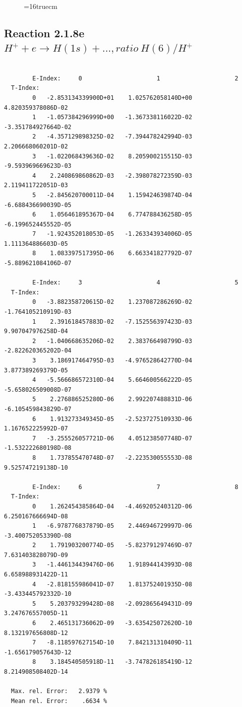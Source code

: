 \documentclass[12pt,dvips]{article}
\begin{document}
\begin{figure} \label{2.1.8rd}
\epsfxsize=16truecm
\end{figure}
\newpage



\subsection{
Reaction 2.1.8e  $H^+ + e \rightarrow H(1s) + ...,  ratio ~ H(6)/H^+$
}

\begin{small}\begin{verbatim}

        E-Index:     0                     1                     2
  T-Index:
        0   -2.853134339900D+01    1.025762058140D+00    4.820359378086D-02
        1   -1.057384296999D+00   -1.367338116022D-02   -3.351784927664D-02
        2   -4.357129898325D-02   -7.394478242994D-03    2.206668060201D-02
        3   -1.022068439636D-02    8.205900215515D-03   -9.593969669623D-03
        4    2.240869860862D-03   -2.398078272359D-03    2.119411722051D-03
        5   -2.845620700011D-04    1.159424639874D-04   -6.688436690039D-05
        6    1.056461895367D-04    6.774788436258D-05   -6.199652445552D-05
        7   -1.924352018053D-05   -1.263343934006D-05    1.111364886603D-05
        8    1.083397517395D-06    6.663341827792D-07   -5.889621084106D-07

        E-Index:     3                     4                     5
  T-Index:
        0   -3.882358720615D-02    1.237087286269D-02   -1.764105210919D-03
        1    2.391618457883D-02   -7.152556397423D-03    9.907047976258D-04
        2   -1.040668635206D-02    2.383766498799D-03   -2.822620365202D-04
        3    3.186917464795D-03   -4.976528642770D-04    3.877389269379D-05
        4   -5.566686572310D-04    5.664600566222D-05   -5.658026509008D-07
        5    2.276886525280D-06    2.992207488831D-06   -6.105459843829D-07
        6    1.913273349345D-05   -2.523727510933D-06    1.167652225992D-07
        7   -3.255526057721D-06    4.051238507748D-07   -1.532222680198D-08
        8    1.737855470748D-07   -2.223530055553D-08    9.525747219138D-10

        E-Index:     6                     7                     8
  T-Index:
        0    1.262454385864D-04   -4.469205240312D-06    6.250167666694D-08
        1   -6.978776837879D-05    2.446946729997D-06   -3.400752053390D-08
        2    1.791903200774D-05   -5.823791297469D-07    7.631403828079D-09
        3   -1.446134439476D-06    1.918944143993D-08    6.658988931422D-11
        4   -2.818155986041D-07    1.813752401935D-08   -3.433445792332D-10
        5    5.203793299428D-08   -2.092865649431D-09    3.247676557005D-11
        6    2.465131736062D-09   -3.635425072620D-10    8.132197656808D-12
        7   -8.118597627154D-10    7.842131310409D-11   -1.656179057643D-12
        8    3.184540505918D-11   -3.747826185419D-12    8.214908508402D-14

  Max. rel. Error:   2.9379 %
  Mean rel. Error:    .6634 %


\end{verbatim}\end{small}
\end{document}
